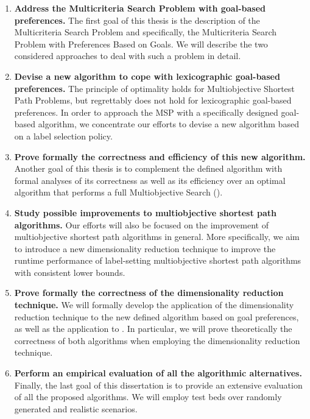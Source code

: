 \begin{enumerate}
	\item \textbf{Address the Multicriteria Search Problem with goal-based preferences.} The first goal of this thesis is the description of the Multicriteria Search Problem and specifically, the Multicriteria Search Problem with Preferences Based on Goals. We will describe the two considered approaches to deal with such a problem in detail. 

	\item \textbf{Devise a new algorithm to cope with lexicographic goal-based preferences.} The principle of optimality holds for Multiobjective Shortest Path Problems, but regrettably does not hold for lexicographic goal-based preferences. In order to approach the MSP with a specifically designed goal-based algorithm, we concentrate our efforts to devise a new algorithm  based on a label selection policy.  

	\item \textbf{Prove formally the correctness and efficiency of this new algorithm.} Another goal of this thesis is to complement the defined algorithm with formal analyses of its correctness as well as its efficiency over an optimal algorithm that performs a full Multiobjective Search (\namoa).	

	\item \textbf{Study possible improvements to multiobjective shortest path algorithms.} Our efforts will also be focused on the improvement of multiobjective shortest path algorithms in general. More specifically, we aim to introduce a new dimensionality reduction technique to improve the runtime performance of label-setting multiobjective shortest path algorithms with consistent lower bounds.

	\item \textbf{Prove formally the correctness of the dimensionality reduction technique.} We will formally develop the application of the dimensionality reduction technique to the new defined algorithm based on goal preferences, as well as the application to \namoa. In particular, we will prove theoretically the correctness of both algorithms when employing the dimensionality reduction technique.

	\item \textbf{Perform an empirical evaluation of all the algorithmic alternatives.} Finally, the last goal of this dissertation is to provide an extensive evaluation of all the proposed algorithms. We will employ test beds over randomly generated and realistic scenarios.
\end{enumerate}

